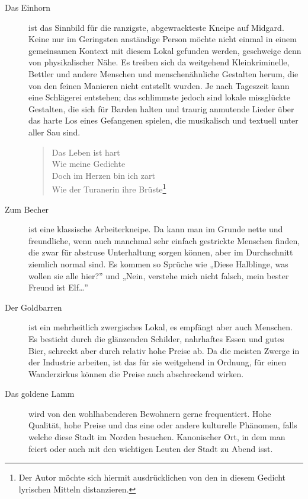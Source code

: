 \documentclass[a4paper,10pt]{scrartcl}
\begin{document}
\begin{description}
\item[Das Einhorn] ist das Sinnbild für die ranzigste, abgewrackteste
  Kneipe auf Midgard. Keine nur im Geringsten anständige Person möchte
  nicht einmal in einem gemeinsamen Kontext mit diesem Lokal gefunden
  werden, geschweige denn von physikalischer Nähe. Es treiben sich da
  weitgehend Kleinkriminelle, Bettler und andere Menschen und
  menschenähnliche Gestalten herum, die von den feinen Manieren nicht
  entstellt wurden. Je nach Tageszeit kann eine Schlägerei entstehen;
  das schlimmste jedoch sind lokale missglückte Gestalten, die sich für
  Barden halten und traurig anmutende Lieder über das harte Los eines
  Gefangenen spielen, die musikalisch und textuell unter aller Sau sind.

  \begin{verse}
    Das Leben ist hart \\
    Wie meine Gedichte \\
    Doch im Herzen bin ich zart \\
    Wie der Turanerin ihre Brüste\footnote{Der Autor möchte sich hiermit
    ausdrücklichen von den in diesem Gedicht lyrischen Mitteln
  distanzieren.}
  \end{verse}

\item[Zum Becher] ist eine klassische Arbeiterkneipe. Da kann man im
  Grunde nette und freundliche, wenn auch manchmal sehr einfach
  gestrickte Menschen finden, die zwar für abstruse Unterhaltung sorgen
  können, aber im Durchschnitt ziemlich normal sind. Es kommen so
  Sprüche wie „Diese Halblinge, was wollen sie alle hier?” und „Nein,
  verstehe mich nicht falsch, mein bester Freund ist Elf…”

\item[Der Goldbarren] ist ein mehrheitlich zwergisches Lokal, es
  empfängt aber auch Menschen. Es besticht durch die glänzenden
  Schilder, nahrhaftes Essen und gutes Bier, schreckt aber durch relativ
  hohe Preise ab. Da die meisten Zwerge in der Industrie arbeiten, ist
  das für sie weitgehend in Ordnung, für einen Wanderzirkus können die
  Preise auch abschreckend wirken.

\item[Das goldene Lamm] wird von den wohlhabenderen Bewohnern gerne
  frequentiert.  Hohe Qualität, hohe Preise und das eine oder andere
  kulturelle Phänomen, falls welche diese Stadt im Norden besuchen.
  Kanonischer Ort, in dem man feiert oder auch mit den wichtigen Leuten
  der Stadt zu Abend isst.


\end{description}
\end{document}
